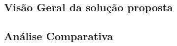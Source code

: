 \subsection{Visão Geral da solução proposta} \label{sec:visaogeral}


\subsection{Análise Comparativa} \label{sec:analise}

